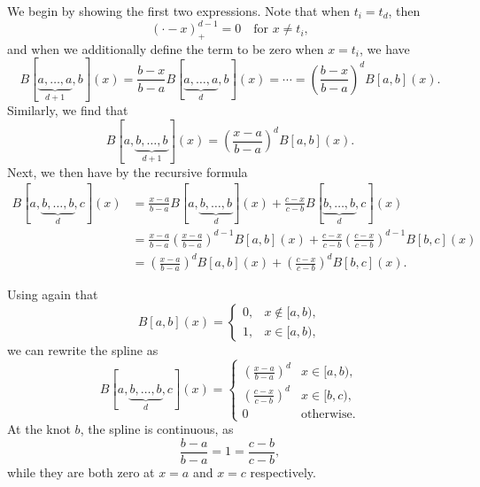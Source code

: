 \begin{solution}
    We begin by showing the first two expressions.
    Note that when $t_i = t_d$, then
    \begin{equation*}
        [t_i, \ldots, t_d](\cdot - x)_+^{d-1} = 0 \quad \text{for } x \neq t_i,
    \end{equation*}
    and when we additionally define the term to be zero when $x = t_i$, we have
    \begin{equation*}
        B[\underbrace{a, \ldots, a}_{d+1}, b](x) = \frac{b - x}{b - a} B[\underbrace{a, \ldots, a}_{d}, b](x) = \cdots =
        \left(\frac{b - x}{b - a}\right)^d B[a, b](x).
    \end{equation*}
    Similarly, we find that
    \begin{equation*}
        B[a, \underbrace{b, \ldots, b}_{d+1}](x) = \left(\frac{x - a}{b - a}\right)^d B[a, b](x).
    \end{equation*}
    Next, we then have by the recursive formula
    \begin{align*}
        B[a, \underbrace{b, \ldots, b}_{d}, c](x)
        &= \frac{x - a}{b - a} B[a, \underbrace{b, \ldots, b}_{d}](x) + \frac{c - x}{c - b} B[\underbrace{b, \ldots, b}_{d}, c](x) \\
        &= \frac{x - a}{b - a} \left( \frac{x - a}{b - a} \right)^{d-1} B[a, b](x) + \frac{c - x}{c - b} \left( \frac{c - x}{c - b} \right)^{d-1} B[b, c](x) \\
        &= \left(\frac{x - a}{b - a}\right)^{d} B[a, b](x) + \left(\frac{c - x}{c - b}\right)^{d} B[b, c](x).
    \end{align*}

    Using again that
    \begin{equation*}
        B[a, b](x) =
        \begin{cases}
            0, & x \notin [a, b), \\ %
            1, & x \in [a, b), %
        \end{cases}
    \end{equation*}
    we can rewrite the spline as
    \begin{equation*}
        B[a, \underbrace{b, \ldots, b}_{d}, c](x) =
        \begin{cases}
            \left( \frac{x - a}{b - a} \right)^d & x \in [a, b), \\ %
            \left( \frac{c - x}{c - b} \right)^{d} & x \in [b, c), \\ %
            0 & \text{otherwise}.
        \end{cases}
    \end{equation*}
    At the knot $b$, the spline is continuous, as
    \begin{equation*}
        \frac{b - a}{b - a} = 1 = \frac{c - b}{c - b},
    \end{equation*}
    while they are both zero at $x = a$ and $x = c$ respectively.
\end{solution}